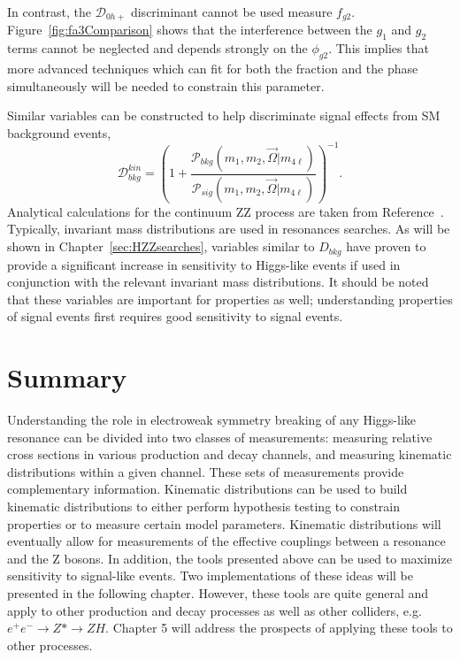 In contrast, the $\mathscr{D}_{0h+}$ discriminant cannot be used 
measure $f_{g2}$.  Figure~\ref{fig:fa3Comparison} shows that the 
interference between the $g_1$ and $g_2$ terms cannot be neglected 
and depends strongly on the $\phi_{g2}$.  This implies that more 
advanced techniques which can fit for both the fraction and the 
phase simultaneously will be needed to constrain this parameter.

Similar variables can be constructed to help discriminate signal 
effects from SM background events,
\begin{equation}
\mathscr{D}^{kin}_{bkg} = \left(1+\frac{\mathscr{P}_{bkg}(m_1,m_2,\vec{\Omega}|m_{4\ell})}{\mathscr{P}_{sig}(m_1,m_2,\vec{\Omega}|m_{4\ell})}\right)^{-1}.
\label{eq:Dbkg}
\end{equation}
Analytical calculations for the continuum ZZ process are taken
from Reference~\cite{Gainer:2011xz,Chen:2012jy}.
Typically, invariant mass distributions are used in resonances 
searches.  As will be shown in Chapter~\ref{sec:HZZsearches}, 
variables similar to $D_{bkg}$ have proven to provide a significant 
increase in sensitivity to  Higgs-like events if used in 
conjunction with the relevant invariant mass distributions.  It 
should be noted that these variables are important
for properties as well; understanding properties of signal events 
first requires good sensitivity to signal events.

\section{Summary}

Understanding the role in electroweak symmetry breaking of any 
Higgs-like resonance can be divided into two classes of
measurements: measuring relative cross sections in various 
production and decay channels, and measuring kinematic distributions
within a given channel.  These sets of measurements provide
complementary information.  Kinematic distributions can be used
to build kinematic distributions to either perform hypothesis 
testing to constrain properties or to measure certain model
parameters.  Kinematic distributions will eventually
allow for measurements of the effective couplings between a 
resonance and the Z bosons. In addition, the tools presented above
can be used to maximize sensitivity to signal-like events.
Two implementations of these ideas will be presented in the 
following chapter. However, these tools are quite general and 
apply to other production and decay processes as well as other 
colliders, e.g. $e^+e^-\to Z*\to ZH$.  Chapter 5 will address 
the prospects of applying these tools to other processes.  
